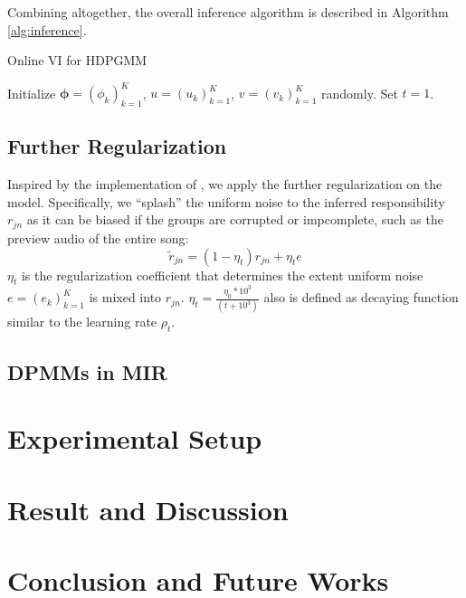 \documentclass{article}
\begin{document}
Combining altogether, the overall inference algorithm is described in Algorithm \ref{alg:inference}.

\begin{algorithm}
\caption{Online VI for HDPGMM}\label{alg:inference}
Initialize $\mathbf{\phi}=(\phi_{k})^{K}_{k=1}$, $u=(u_{k})^{K}_{k=1}$, $v=(v_{k})^{K}_{k=1}$ randomly. Set $t=1$.\\
\end{algorithm}

\subsection{Further Regularization}\label{sec:hdpgmm:regularization}

Inspired by the implementation of \cite{DBLP:journals/jmlr/WangPB11, 10.1214/06-BA104}, we apply the further regularization on the model. Specifically, we ``splash'' the uniform noise to the inferred responsibility $r_{jn}$ as it can be biased if the groups are corrupted or impcomplete, such as the preview audio of the entire song:
\begin{equation}
    \tilde{r}_{jn} = (1 - \eta_{t}) r_{jn} + \eta_{t} e
\end{equation}
$\eta_{t}$ is the regularization coefficient that determines the extent uniform noise $e = (e_{k})_{k=1}^{K}$ is mixed into $r_{jn}$. $\eta_{t} = \frac{\eta_{0} * 10^{3}}{(t + 10^{3})}$ also is defined as decaying function similar to the learning rate $\rho_{t}$.


\subsection{DPMMs in MIR}\label{sec:hdpgmm:in_mir}



\section{Experimental Setup}


\section{Result and Discussion}


\section{Conclusion and Future Works}




\end{document}
